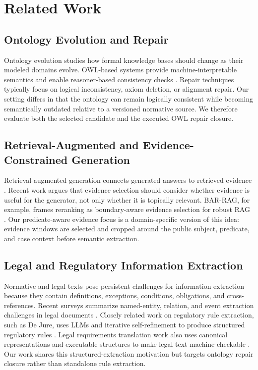 \documentclass[11pt]{article}
\begin{document}
\section{Related Work}

\subsection{Ontology Evolution and Repair}

Ontology evolution studies how formal knowledge bases should change as their modeled domains evolve. OWL-based systems provide machine-interpretable semantics and enable reasoner-based consistency checks \citep{w3cowl2}. Repair techniques typically focus on logical inconsistency, axiom deletion, or alignment repair. Our setting differs in that the ontology can remain logically consistent while becoming semantically outdated relative to a versioned normative source. We therefore evaluate both the selected candidate and the executed OWL repair closure.

\subsection{Retrieval-Augmented and Evidence-Constrained Generation}

Retrieval-augmented generation connects generated answers to retrieved evidence \citep{lewis2020rag}. Recent work argues that evidence selection should consider whether evidence is useful for the generator, not only whether it is topically relevant. BAR-RAG, for example, frames reranking as boundary-aware evidence selection for robust RAG \citep{sun2026barrag}. Our predicate-aware evidence focus is a domain-specific version of this idea: evidence windows are selected and cropped around the public subject, predicate, and case context before semantic extraction.

\subsection{Legal and Regulatory Information Extraction}

Normative and legal texts pose persistent challenges for information extraction because they contain definitions, exceptions, conditions, obligations, and cross-references. Recent surveys summarize named-entity, relation, and event extraction challenges in legal documents \citep{premasiri2025legalie}. Closely related work on regulatory rule extraction, such as De Jure, uses LLMs and iterative self-refinement to produce structured regulatory rules \citep{guliani2026dejure}. Legal requirements translation work also uses canonical representations and executable structures to make legal text machine-checkable \citep{singhal2025legalrequirements}. Our work shares this structured-extraction motivation but targets ontology repair closure rather than standalone rule extraction.
\end{document}
